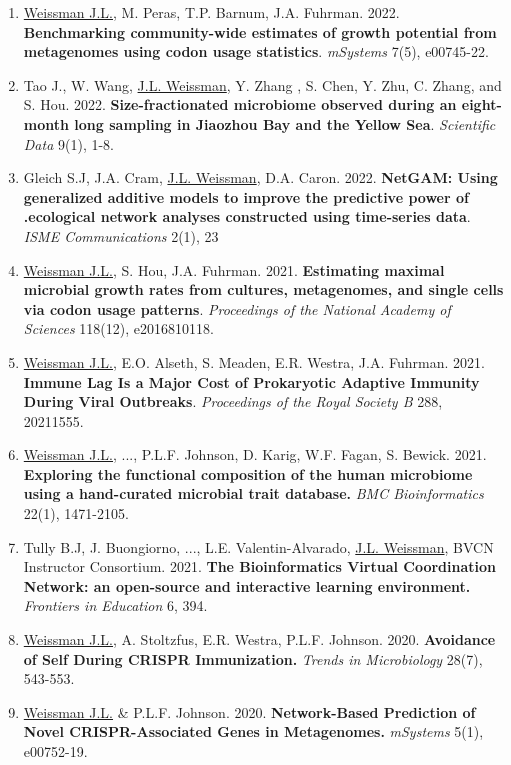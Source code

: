 \documentclass[]{res}
\begin{document}
\begin{resume}
\begin{enumerate}[leftmargin=*]
  \item \underline{Weissman J.L.}, M. Peras, T.P. Barnum, J.A. Fuhrman. 2022. {\bf Benchmarking community-wide estimates of growth potential from metagenomes using codon usage statistics}. \emph{mSystems} 7(5), e00745-22.
  
    \item  Tao J., W. Wang, \underline{J.L. Weissman}, Y. Zhang , S. Chen, Y. Zhu, C. Zhang, and S. Hou. 2022. {\bf Size-fractionated microbiome observed during an eight-month long sampling in Jiaozhou Bay and the Yellow Sea}. \emph{Scientific Data} 9(1), 1-8.
 
 \item Gleich S.J, J.A. Cram, \underline{J.L. Weissman}, D.A. Caron. 2022. {\bf NetGAM: Using generalized additive models to improve the predictive power of .ecological network analyses constructed using time-series data}. \emph{ISME Communications} 2(1), 23
 
\item \underline{Weissman J.L.}, S. Hou, J.A. Fuhrman. 2021. {\bf Estimating maximal microbial growth rates from cultures, metagenomes, and single cells via codon usage patterns}. \emph{Proceedings of the National Academy of Sciences} 118(12), e2016810118. 
 
\item \underline{Weissman J.L.}, E.O. Alseth, S. Meaden, E.R. Westra, J.A. Fuhrman. 2021. {\bf Immune Lag Is a Major Cost of Prokaryotic Adaptive Immunity During Viral Outbreaks}. \emph{Proceedings of the Royal Society B} 288, 20211555.

\item \underline{Weissman J.L.}, ..., P.L.F. Johnson, D. Karig, W.F. Fagan, S. Bewick. 2021. {\bf Exploring the functional composition of the human microbiome using a hand-curated microbial trait database.} \emph{BMC Bioinformatics} 22(1), 1471-2105.

\item Tully B.J, J. Buongiorno, ..., L.E. Valentin-Alvarado, \underline{J.L. Weissman}, BVCN Instructor Consortium. 2021. {\bf The Bioinformatics Virtual Coordination Network: an open-source and interactive learning environment.} \emph{Frontiers in Education} 6, 394.

\item \underline{Weissman J.L.}, A. Stoltzfus, E.R. Westra, P.L.F. Johnson. 2020. {\bf Avoidance of Self During CRISPR Immunization.} \emph{Trends in Microbiology} 28(7), 543-553.

\item \underline{Weissman J.L.} \& P.L.F. Johnson. 2020. {\bf Network-Based Prediction of Novel CRISPR-Associated Genes in Metagenomes.} \emph{mSystems} 5(1), e00752-19.


\end{enumerate}
\end{resume}
\end{document}
